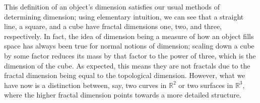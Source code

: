 This definition of an object's dimension satisfies our usual methods of determining dimension; using elementary intuition, we can see that a straight line, a square, and a cube have fractal dimensions one, two, and three, respectively. In fact, the idea of dimension being a measure of how an object fills space has always been true for normal notions of dimension; scaling down a cube by some factor reduces its mass by that factor to the power of three, which is the dimension of the cube. As expected, this means they are not fractals due to the fractal dimension being equal to the topological dimension. However, what we have now is a distinction between, say, two curves in $\mathbb{R}^2$ or two surfaces in $\mathbb{R}^3$, where the higher fractal dimension points towards a more detailed structure.
    

